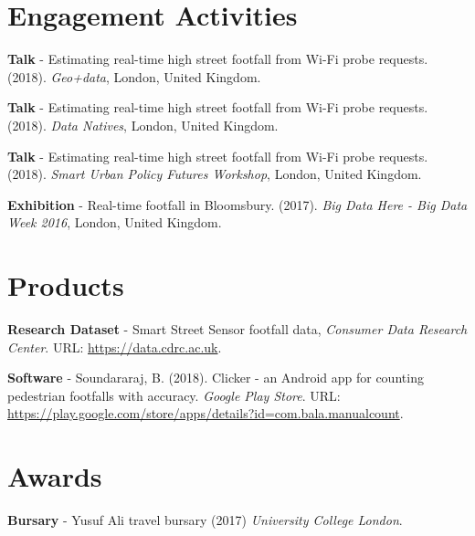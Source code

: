 \section*{Engagement Activities}
\vspace{0.2cm} \par \noindent \textbf{Talk} - Estimating real-time high street footfall from Wi-Fi probe requests. (2018). \textit{Geo+data}, London, United Kingdom.
\vspace{0.2cm} \par \noindent \textbf{Talk} - Estimating real-time high street footfall from Wi-Fi probe requests. (2018). \textit{Data Natives}, London, United Kingdom.
\vspace{0.2cm} \par \noindent \textbf{Talk} - Estimating real-time high street footfall from Wi-Fi probe requests. (2018). \textit{Smart Urban Policy Futures Workshop}, London, United Kingdom.
\vspace{0.2cm} \par \noindent \textbf{Exhibition} - Real-time footfall in Bloomsbury. (2017). \textit{Big Data Here - Big Data Week 2016}, London, United Kingdom.

\section*{Products}
\vspace{0.2cm} \par \noindent \textbf{Research Dataset} - Smart Street Sensor footfall data, \textit{Consumer Data Research Center}. URL: \url{https://data.cdrc.ac.uk}.
\vspace{0.2cm} \par \noindent \textbf{Software} - Soundararaj, B. (2018). Clicker - an Android app for counting pedestrian footfalls with accuracy. \textit{Google Play Store}. URL: \url{https://play.google.com/store/apps/details?id=com.bala.manualcount}.

\section*{Awards}
\vspace{0.2cm} \par \noindent \textbf{Bursary} - Yusuf Ali travel bursary (2017) \textit{University College London}.


